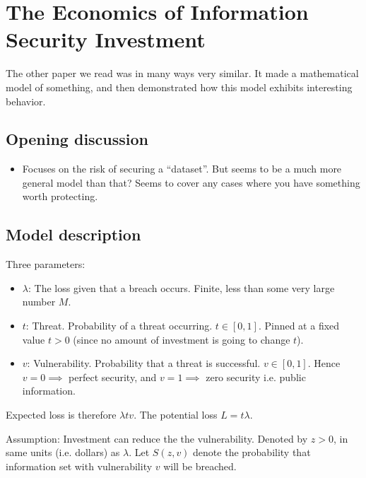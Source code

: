 \documentclass[11pt]{article}
\begin{document}
\section{The Economics of Information Security Investment}

The other paper we read was in many ways very similar. It made a mathematical model of something, and then demonstrated how this model exhibits interesting behavior.

\subsection{Opening discussion}

\begin{itemize}
    \item Focuses on the risk of securing a ``dataset''. But seems to be a much more general model than that? Seems to cover any cases where you have something worth protecting.
\end{itemize}

\subsection{Model description}

Three parameters:
\begin{itemize}
    \item $\lambda$: The loss given that a breach occurs. Finite, less than some very large number $M$.
    \item $t$: Threat. Probability of a threat occurring. $t \in [0,1]$. Pinned at a fixed value $t > 0$ (since no amount of investment is going to change $t$).
    \item $v$: Vulnerability. Probability that a threat is successful. $v \in [0,1]$. Hence $v=0 \implies$ perfect security, and $v=1 \implies$ zero security i.e. public information.
\end{itemize}

Expected loss is therefore $\lambda t v$. The potential loss $L = t \lambda$.

Assumption: Investment can reduce the the vulnerability. Denoted by $z>0$, in same units (i.e. dollars) as $\lambda$. 
Let $S(z,v)$ denote the probability that information set with vulnerability $v$ will be breached. 
\end{document}
